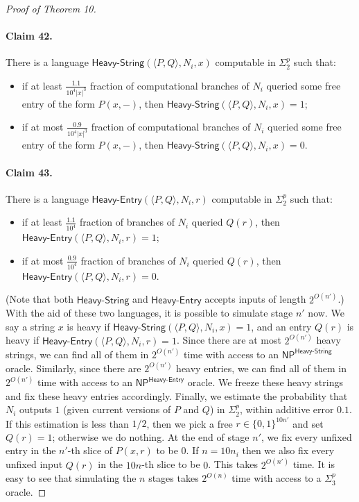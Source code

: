 \begin{proof}[Proof of Theorem 10]
\paragraph{Claim 42.} There is a language $\mathsf{Heavy\text{-}String}(\langle P,Q\rangle,N_i,x)$ computable in $\Sigma^p_2$ such that:
\begin{itemize}
\item if at least $\frac{1.1}{10^4|x|^3}$ fraction of computational branches of $N_i$ queried some free entry of the form $P(x,-)$, then $\mathsf{Heavy\text{-}String}(\langle P,Q\rangle,N_i,x)=1$;
\item if at most $\frac{0.9}{10^4|x|^3}$ fraction of computational branches of $N_i$ queried some free entry of the form $P(x,-)$, then $\mathsf{Heavy\text{-}String}(\langle P,Q\rangle,N_i,x)=0$.
\end{itemize}
\paragraph{Claim 43.} There is a language $\mathsf{Heavy\text{-}Entry}(\langle P,Q\rangle,N_i,r)$ computable in $\Sigma^p_2$ such that:
\begin{itemize}
\item if at least $\frac{1.1}{10^4}$ fraction of branches of $N_i$ queried $Q(r)$, then $\mathsf{Heavy\text{-}Entry}(\langle P,Q\rangle,N_i,r)=1$;
\item if at most $\frac{0.9}{10^4}$ fraction of branches of $N_i$ queried $Q(r)$, then $\mathsf{Heavy\text{-}Entry}(\langle P,Q\rangle,N_i,r)=0$.
\end{itemize}
(Note that both $\mathsf{Heavy\text{-}String}$ and $\mathsf{Heavy\text{-}Entry}$ accepts inputs of length $2^{O(n')}$.)
With the aid of these two languages, it is possible to simulate stage $n'$ now. We say a string $x$ is heavy if $\mathsf{Heavy\text{-}String}(\langle P,Q\rangle,N_i,x)=1$, and an entry $Q(r)$ is heavy if $\mathsf{Heavy\text{-}Entry}(\langle P,Q\rangle,N_i,r)=1$. Since there are at most $2^{O(n')}$ heavy strings, we can find all of them in $2^{O(n')}$ time with access to an $\mathsf{NP}^{\mathsf{Heavy\text{-}String}}$ oracle. Similarly, since there are $2^{O(n')}$ heavy entries, we can find all of them in $2^{O(n')}$ time with access to an $\mathsf{NP}^{\mathsf{Heavy\text{-}Entry}}$ oracle. We freeze these heavy strings and fix these heavy entries accordingly.
Finally, we estimate the probability that $N_i$ outputs $1$ (given current versions of $P$ and $Q$) in $\Sigma^p_2$, within additive error $0.1$. If this estimation is less than $1/2$, then we pick a free $r\in\{0,1\}^{10n'}$ and set $Q(r)=1$; otherwise we do nothing.
At the end of stage $n'$, we fix every unfixed entry in the $n'$-th slice of $P(x,r)$ to be $0$. If $n=10n_i$ then we also fix every unfixed input $Q(r)$ in the $10n$-th slice to be $0$. This takes $2^{O(n')}$ time.
It is easy to see that simulating the $n$ stages takes $2^{O(n)}$ time with access to a $\Sigma^p_3$ oracle.
\end{proof}
